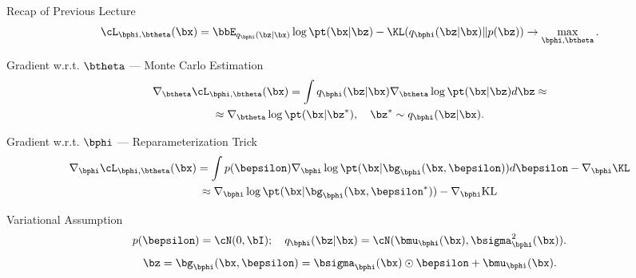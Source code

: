 \documentclass{beamer}
\begin{document}
\begin{frame}{Recap of Previous Lecture}
	\vspace{-0.3cm}
	\[
		\cL_{\bphi, \btheta}(\bx)  = \bbE_{q_{\bphi}(\bz| \bx)} \log \pt(\bx| \bz) - \KL(q_{\bphi}(\bz| \bx) \| p(\bz)) \rightarrow \max_{\bphi, \btheta}.
	\]
	\vspace{-0.3cm}
	\begin{block}{Gradient w.r.t. $\btheta$ — Monte Carlo Estimation}
		\vspace{-0.8cm}
		\begin{multline*}
			\nabla_{\btheta}\cL_{\bphi, \btheta}(\bx)
			= \int q_{\bphi}(\bz| \bx) \nabla_{\btheta}\log \pt(\bx| \bz) d \bz \approx  \\
			\approx \nabla_{\btheta}\log \pt(\bx|\bz^*), \quad \bz^* \sim q_{\bphi}(\bz| \bx).
		\end{multline*}
		\vspace{-0.7cm}
	\end{block}
	\begin{block}{Gradient w.r.t. $\bphi$ — Reparameterization Trick}
		\vspace{-0.8cm}
		\begin{multline*}
			\nabla_{\bphi}\cL_{\bphi, \btheta}(\bx) = \int p(\bepsilon) \nabla_{\bphi} \log \pt(\bx | \bg_{\bphi}(\bx, \bepsilon)) d\bepsilon  - \nabla_{\bphi} \KL
			\\ \approx \nabla_{\bphi} \log \pt(\bx | \bg_{\bphi}(\bx, \bepsilon^*))  - \nabla_{\bphi} \text{KL}
		\end{multline*}
		\vspace{-0.5cm}
	\end{block}
	\vspace{-0.3cm}
	\begin{block}{Variational Assumption}
		\vspace{-0.3cm}
		\[
			p(\bepsilon) = \cN(0, \bI); \quad  q_{\bphi}(\bz| \bx) = \cN (\bmu_{\bphi}(\bx), \bsigma^2_{\bphi}(\bx)).
		\]
		\[
			\bz = \bg_{\bphi}(\bx, \bepsilon) = \bsigma_{\bphi}(\bx) \odot \bepsilon + \bmu_{\bphi}(\bx).
		\]
	\end{block}
\end{frame}
\end{document}
